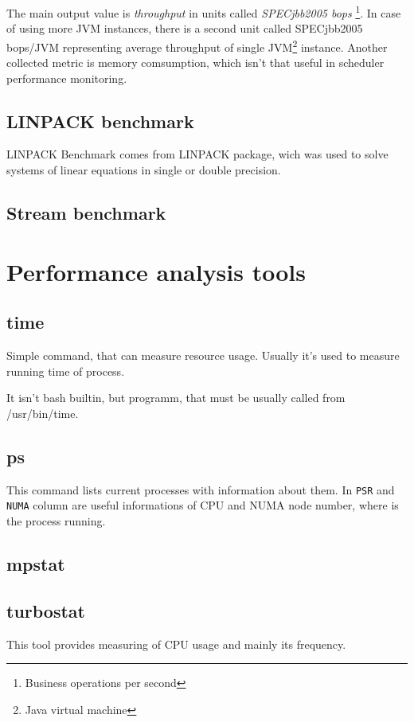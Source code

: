 The main output value is \emph{throughput} in units called \emph{SPECjbb2005
  bops} \footnote{Business operations per second}.
In case of using more JVM instances, there is a second unit called SPECjbb2005
bops/JVM representing average throughput of single JVM\footnote{Java virtual machine} instance.
Another collected metric is memory comsumption, which isn't that useful in
scheduler performance monitoring.

\subsection{LINPACK benchmark}
LINPACK Benchmark comes from LINPACK package, wich was used to solve systems of linear equations in single or double precision.

\subsection{Stream benchmark}

\section{Performance analysis tools}

\subsection{time}
Simple command, that can measure resource usage. Usually it's used to measure
running time of process.

It isn't bash builtin, but programm, that must be usually called from /usr/bin/time.

\subsection{ps}
This command lists current processes with information about them. In
\texttt{PSR} and \texttt{NUMA} column are useful informations of CPU and NUMA
node number, where is the process running.

\subsection{mpstat}

\subsection{turbostat}
This tool provides measuring of CPU usage and mainly its frequency.

